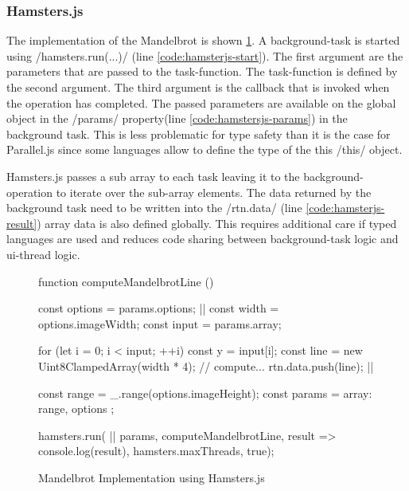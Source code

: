 \subsubsection{Hamsters.js}
The implementation of the Mandelbrot is shown \cref{fig:mandelbrot-hamsterjs}. A background-task is started using \javascriptinline/hamsters.run(...)/ (line \ref{code:hamsterjs-start}). The first argument are the parameters that are passed to the task-function. The task-function is defined by the second argument. The third argument is the callback that is invoked when the operation has completed. The passed parameters are available on the global object in the \javascriptinline/params/ property(line \ref{code:hamstersjs-params}) in the background task. This is less problematic for type safety than it is the case for Parallel.js since some languages allow to define the type of the this \javascriptinline/this/ object. 

Hamsters.js passes a sub array to each task leaving it to the background-operation to iterate over the sub-array elements. The data returned by the background task need to be written into the \javascriptinline/rtn.data/ (line \ref{code:hamsterjs-result}) array data is also defined globally. This requires additional care if typed languages are used and reduces code sharing between background-task logic and ui-thread logic.

\begin{figure}
\begin{javascriptcode}
function computeMandelbrotLine () {
	const options = params.options; |$\label{code:hamstersjs-params}$|
	const width = options.imageWidth;
	const input = params.array;

	for (let i = 0; i < input; ++i) {
		const y = input[i];
		const line = new Uint8ClampedArray(width * 4);
		// compute...
		rtn.data.push(line); |$\label{code:hamsterjs-result}$|
	}
}

const range = _.range(options.imageHeight);
const params = {
	array: range,
	options
};

hamsters.run( |$\label{code:hamsterjs-start}$|
	params,  
	computeMandelbrotLine, 
	result => console.log(result), 
	hamsters.maxThreads, 
	true);
\end{javascriptcode}
\caption{Mandelbrot Implementation using Hamsters.js}
\label{fig:mandelbrot-hamsterjs}
\end{figure}

